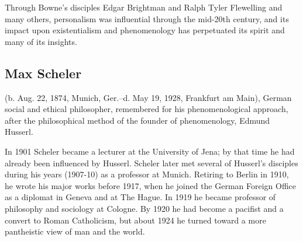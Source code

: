 \documentclass[12pt]{article}
\begin{document}
                                      Through Bowne's disciples Edgar Brightman and Ralph Tyler Flewelling
                                      and many others, personalism was influential through the mid-20th
                                      century, and its impact upon existentialism and phenomenology has
                                      perpetuated its spirit and many of its insights. 


\subsection{Max Scheler}
                                      (b. Aug. 22, 1874, Munich, Ger.--d. May 19, 1928, Frankfurt am Main),
                                      German social and ethical philosopher, remembered for his
                                      phenomenological approach, after the philosophical method of the
                                      founder of phenomenology, Edmund Husserl. 




                                      In 1901 Scheler became a lecturer at the University of Jena; by that
                                      time he had already been influenced by Husserl. Scheler later met
                                      several of Husserl's disciples during his years (1907-10) as a
                                      professor at Munich. Retiring to Berlin in 1910, he wrote his major
                                      works before 1917, when he joined the German Foreign Office as a
                                      diplomat in Geneva and at The Hague. In 1919 he became professor of
                                      philosophy and sociology at Cologne. By 1920 he had become a pacifist
                                      and a convert to Roman Catholicism, but about 1924 he turned toward
                                      a more pantheistic view of man and the world. 
\end{document}
